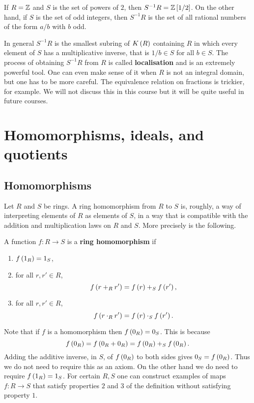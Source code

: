 \begin{example2}
If $ R = \mathbb{Z} $ and $ S $ is the set of powers of $ 2 $, then $ S^{-1}R = \mathbb{Z}\left[ 1 / 2 \right] $. On the other hand, if $ S $ is the set of odd integers, then $ S^{-1}R $ is the set of all rational numbers of the form $ a / b $ with $ b $ odd.
\end{example2}

In general $ S^{-1}R $ is the smallest subring of $ K\left( R \right) $ containing $ R $ in which every element of $ S $ has a multiplicative inverse, that is $ 1 / b \in S $ for all $ b \in S $. The process of obtaining $ S^{-1}R $ from $ R $ is called \textbf{localisation} and is an extremely powerful tool. One can even make sense of it when $ R $ is not an integral domain, but one has to be more careful. The equivalence relation on fractions is trickier, for example. We will not discuss this in this course but it will be quite useful in future courses.

\pagebreak

\section{Homomorphisms, ideals, and quotients}

\subsection{Homomorphisms}

Let $ R $ and $ S $ be rings. A ring homomorphism from $ R $ to $ S $ is, roughly, a way of interpreting elements of $ R $ as elements of $ S $, in a way that is compatible with the addition and multiplication laws on $ R $ and $ S $. More precisely is the following.

\begin{definition}
A function $ f : R \to S $ is a \textbf{ring homomorphism} if
\begin{enumerate}
\item $ f\left( 1_R \right) = 1_S $,
\item for all $ r, r' \in R $,
$$ f\left( r +_R r' \right) = f\left( r \right) +_S f\left( r' \right), $$
\item for all $ r, r' \in R $,
$$ f\left( r \cdot_R r' \right) = f\left( r \right) \cdot_S f\left( r' \right). $$
\end{enumerate}
\end{definition}

Note that if $ f $ is a homomorphism then $ f\left( 0_R \right) = 0_S $. This is because
$$ f\left( 0_R \right) = f\left( 0_R + 0_R \right) = f\left( 0_R \right) +_S f\left( 0_R \right). $$
Adding the additive inverse, in $ S $, of $ f\left( 0_R \right) $ to both sides gives $ 0_S = f\left( 0_R \right) $. Thus we do not need to require this as an axiom. On the other hand we do need to require $ f\left( 1_R \right) = 1_S $. For certain $ R, S $ one can construct examples of maps $ f : R \to S $ that satisfy properties $ 2 $ and $ 3 $ of the definition without satisfying property $ 1 $.

